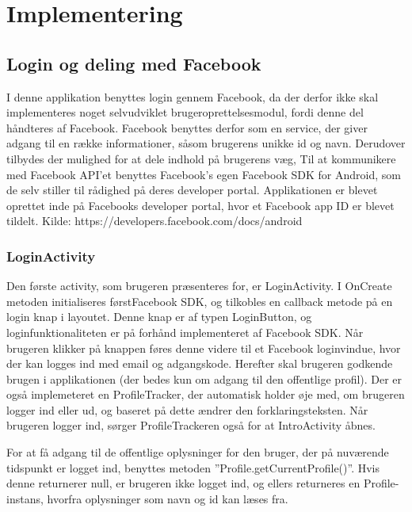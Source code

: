 \thispagestyle{fancy}
\chapter{Implementering}
\label{chp:Implementering}

\section{Login og deling med Facebook}
I denne applikation benyttes login gennem Facebook, da der derfor ikke skal implementeres noget selvudviklet brugeroprettelsesmodul, fordi denne del håndteres af Facebook. Facebook benyttes derfor som en service, der giver adgang til en række informationer, såsom brugerens unikke id og navn. Derudover tilbydes der mulighed for at dele indhold på brugerens væg, Til at kommunikere med Facebook API’et benyttes Facebook’s egen Facebook SDK for Android, som de selv stiller til rådighed på deres developer portal. Applikationen er blevet oprettet inde på Facebooks developer portal, hvor et Facebook app ID er blevet tildelt. 
Kilde: https://developers.facebook.com/docs/android

\subsection{LoginActivity}
Den første activity, som brugeren præsenteres for, er LoginActivity. I OnCreate metoden initialiseres førstFacebook SDK, og tilkobles en callback metode på en login knap i layoutet. Denne knap er af typen LoginButton, og loginfunktionaliteten er på forhånd implementeret af Facebook SDK. Når brugeren klikker på knappen føres denne videre til et Facebook loginvindue, hvor der kan logges ind med email og adgangskode. Herefter skal brugeren godkende brugen i applikationen (der bedes kun om adgang til den offentlige profil). Der er også implemeteret en ProfileTracker, der automatisk holder øje med, om brugeren logger ind eller ud, og baseret på dette ændrer den forklaringsteksten. Når brugeren logger ind, sørger ProfileTrackeren også for at IntroActivity åbnes.

For at få adgang til de offentlige oplysninger for den bruger, der på nuværende tidspunkt er logget ind, benyttes metoden ”Profile.getCurrentProfile()”. Hvis denne returnerer null, er brugeren ikke logget ind, og ellers returneres en Profile-instans, hvorfra oplysninger som navn og id kan læses fra.


